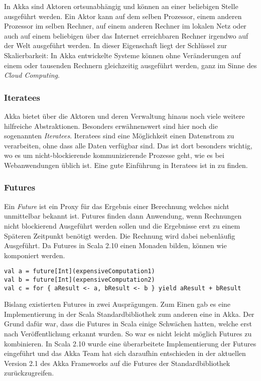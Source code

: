 In Akka sind Aktoren ortsunabhängig und können an einer beliebigen Stelle ausgeführt werden. Ein
Aktor kann auf dem selben Prozessor, einem anderen Prozessor im selben Rechner, auf einem anderen
Rechner im lokalen Netz oder auch auf einem beliebigen über das Internet erreichbaren Rechner
irgendwo auf der Welt ausgeführt werden. In dieser Eigenschaft liegt der Schlüssel zur
Skalierbarkeit: In Akka entwickelte Systeme können ohne Veränderungen auf einem oder tausenden
Rechnern gleichzeitig ausgeführt werden, ganz im Sinne des \textit{Cloud Computing}.

\subsubsection{Iteratees}
\label{sec:iteratees}

Akka bietet über die Aktoren und deren Verwaltung hinaus noch viele weitere hilfreiche
Abstraktionen. Besonders erwähnenswert sind hier noch die sogenannten \textit{Iteratees}. Iteratees
sind eine Möglichkeit einen Datenstrom zu verarbeiten, ohne dass alle Daten verfügbar sind. Das ist
dort besonders wichtig, wo es um nicht-blockierende kommunizierende Prozesse geht, wie es bei
Webanwendungen üblich ist. Eine gute Einführung in Iteratees ist in \cite{iteratees} zu finden.

\subsubsection{Futures}
\label{sec:futures}

Ein \textit{Future} ist ein Proxy für das Ergebnis einer Berechnung welches nicht unmittelbar
bekannt ist. Futures finden dann Anwendung, wenn Rechnungen nicht blockierend Ausgeführt werden
sollen und die Ergebnisse erst zu einem Späteren Zeitpunkt benötigt werden. Die Rechnung wird dabei
nebenläufig Ausgeführt. Da Futures in Scala 2.10 einen Monaden bilden, können wie komponiert werden.

\begin{lstlisting}
val a = future[Int](expensiveComputation1)
val b = future[Int](expensiveComputation2)
val c = for { aResult <- a, bResult <- b } yield aResult + bResult
\end{lstlisting}

Bislang existierten Futures in zwei Ausprägungen. Zum Einen gab es eine Implementierung in der Scala
Standardbibliothek zum anderen eine in Akka. Der Grund dafür war, dass die Futures in Scala einige
Schwächen hatten, welche erst nach Veröffentlichung erkannt wurden. So war es nicht leicht möglich
Futures zu kombinieren. In Scala 2.10 wurde eine überarbeitete Implementierung der Futures
eingeführt und das Akka Team hat sich daraufhin entschieden in der aktuellen Version 2.1 des Akka
Frameworks auf die Futures der Standardbibliothek zurückzugreifen.

